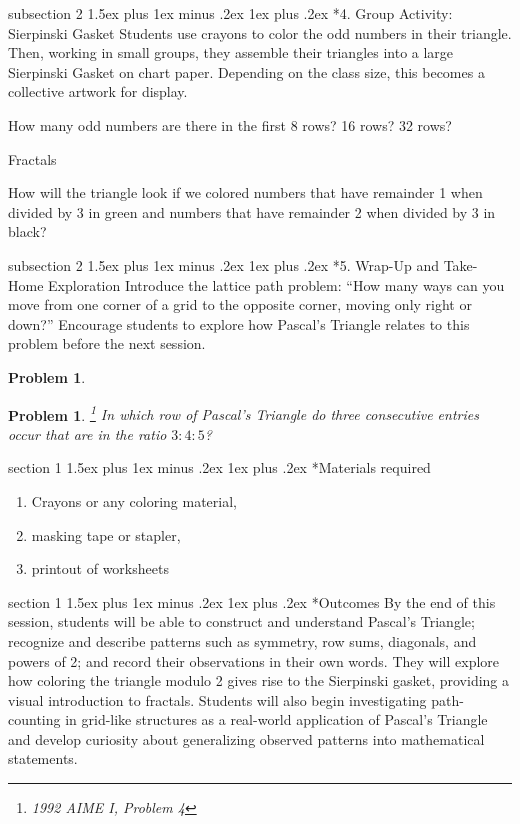 \documentclass[a4paper,twoside,notitlepage,
11pt,
]{amsart}
\makeatletter
\newtheorem{xca}[theorem]{Problem}
\renewcommand{\section}{\@startsection
  {section}%
  {1}%
  {\z@}%
  {1.5ex plus 1ex minus .2ex}%
  {1ex plus .2ex}%
  {\normalfont\bfseries}}%
\renewcommand{\subsection}{\@startsection
    {subsection}%
    {2}%
    {\z@}%
    {1.5ex plus 1ex minus .2ex}%
    {1ex plus .2ex}%
    {\normalfont\itshape}}%
\makeatother
\begin{document}
\subsection*{4. Group Activity: Sierpinski Gasket}
Students use crayons to color the odd numbers in their triangle. Then, working in small groups, they assemble their triangles into a large Sierpinski Gasket on chart paper. Depending on the class size, this becomes a collective artwork for display.

How many odd numbers are there in the first 8 rows? 16 rows? 32 rows?

Fractals

How will the triangle look if we colored numbers that have remainder 1 when divided by 3 in green and numbers that have remainder 2 when divided by 3 in black?

\subsection*{5. Wrap-Up and Take-Home Exploration}
Introduce the lattice path problem: ``How many ways can you move from one corner of a grid to the opposite corner, moving only right or down?'' Encourage students to explore how Pascal's Triangle relates to this problem before the next session.

\begin{xca}

\end{xca}

\begin{xca}\footnote{1992 AIME I, Problem 4}
  In which row of Pascal's Triangle do three consecutive entries occur that are in the ratio $3: 4: 5$?
\end{xca}
\section*{Materials required}
\begin{enumerate}
    \item Crayons or any coloring material,
    \item masking tape or stapler,
    \item printout of worksheets
\end{enumerate}


\section*{Outcomes}
By the end of this session, students will be able to construct and understand Pascal's Triangle; recognize and describe patterns such as symmetry, row sums, diagonals, and powers of 2; and record their observations in their own words. They will explore how coloring the triangle modulo 2 gives rise to the Sierpinski gasket, providing a visual introduction to fractals. Students will also begin investigating path-counting in grid-like structures as a real-world application of Pascal's Triangle and develop curiosity about generalizing observed patterns into mathematical statements.
\end{document}
